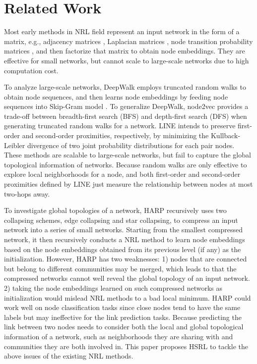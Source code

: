 \documentclass[conference]{IEEEtran}
\begin{document}
\section{Related Work}
Most early methods in NRL field represent an input network in the form of a matrix, e.g., adjacency matrices \cite{roweis2000nonlinear, ahmed2013distributed}, Laplacian matrices \cite{belkin2002laplacian}, node transition probability matrices \cite{cao2015grarep}, and then factorize that matrix to obtain node embeddings. They are effective for small networks, but cannot scale to large-scale networks due to high computation cost.

To analyze large-scale networks, DeepWalk \cite{perozzi2014deepwalk} employs truncated random walks to obtain node sequences, and then learns node embeddings by feeding node sequences into Skip-Gram model \cite{ahmed2013distributed}. To generalize DeepWalk, node2vec \cite{grover2016node2vec} provides a trade-off between breadth-first search (BFS) and depth-first search (DFS) when generating truncated random walks for a network. LINE \cite{tang2015line} intends to preserve first-order and second-order proximities, respectively, by minimizing the Kullback-Leibler divergence of two joint probability distributions for each pair nodes. These methods are scalable to large-scale networks, but fail to capture the global topological information of networks. Because random walks are only effective to explore local neighborhoods for a node, and both first-order and second-order proximities defined by LINE just measure the relationship between nodes at most two-hops away.

To investigate global topologies of a network, HARP \cite{chen2018harp} recursively uses two collapsing schemes, edge collapsing and star collapsing, to compress an input network into a series of small networks. Starting from the smallest compressed network, it then recursively conducts a NRL method to learn node embeddings based on the node embeddings obtained from its previous level (if any) as the initialization. However, HARP has two weaknesses: 1) nodes that are connected but belong to different communities may be merged, which leads to that the compressed networks cannot well reveal the global topology of an input network. 2) taking the node embeddings learned on such compressed networks as initialization would mislead NRL methods to a bad local minimum. HARP could work well on node classification tasks since close nodes tend to have the same labels but may ineffective for the link prediction tasks. Because predicting the link between two nodes needs to consider both the local and global topological information of a network, such as neighborhoods they are sharing with and communities they are both involved in. This paper proposes HSRL to tackle the above issues of the existing NRL methods.
\end{document}
